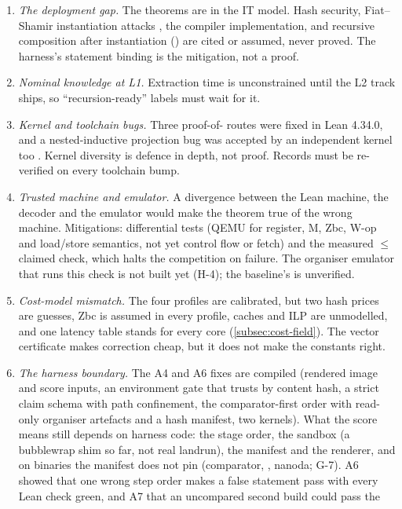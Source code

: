 \begin{enumerate}[nosep]
\item \emph{The deployment gap.} The theorems are in the IT model. Hash security, Fiat--Shamir
  instantiation attacks \cite{KRS25,Fen26-GenR1CS}, the compiler implementation, and recursive
  composition after instantiation () are cited or assumed, never proved. The
  harness's statement binding is the mitigation, not a proof.
\item \emph{Nominal knowledge at L1.} Extraction time is unconstrained until the L2 track ships, so
  \enquote{recursion-ready} labels must wait for it.
\item \emph{Kernel and toolchain bugs.} Three proof-of- routes were fixed in Lean 4.34.0,
  and a nested-inductive projection bug was accepted by an independent kernel too
  \cite{lean4340,brossard2026leanproj}. Kernel diversity is defence in depth, not proof. Records must
  be re-verified on every toolchain bump.
\item \emph{Trusted machine and emulator.} A divergence between the Lean machine, the decoder and the
  emulator would make the theorem true of the wrong machine. Mitigations: differential tests (QEMU for
  register, M, Zbc, W-op and load/store semantics, not yet control flow or fetch) and the measured
  $\le$ claimed check, which halts the competition on failure. The organiser emulator that runs this
  check is not built yet (H-4); the baseline's  is unverified.
\item \emph{Cost-model mismatch.} The four profiles are calibrated, but two hash prices are guesses,
  Zbc is assumed in every profile, caches and ILP are unmodelled, and one latency table stands for
  every core (\cref{subsec:cost-field}). The vector certificate makes correction cheap, but it does not
  make the constants right.
\item \emph{The harness boundary.} The A4 and A6 fixes are compiled (rendered image and score inputs,
  an environment gate that trusts by content hash, a strict claim schema with path confinement, the
  comparator-first order with read-only organiser artefacts and a hash manifest, two kernels). What
  the score means still depends on harness code: the stage order, the sandbox (a bubblewrap shim so
  far, not real landrun), the manifest and the renderer, and on binaries the manifest does not pin
  (comparator, , nanoda; G-7). A6 showed that one wrong step order makes a false
  statement pass with every Lean check green, and A7 that an uncompared second build could pass the

\end{enumerate}
